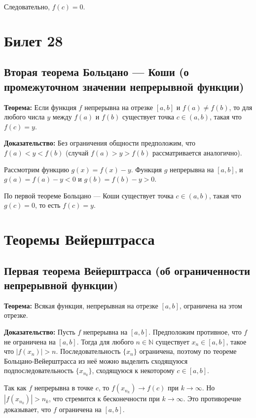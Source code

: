 \documentclass{article}
\begin{document}
Следовательно, \( f(c) = 0 \).

\section{Билет 28}

\subsection*{Вторая теорема Больцано — Коши (о промежуточном значении непрерывной функции)}

\textbf{Теорема:} Если функция \( f \) непрерывна на отрезке \([a, b]\) и \( f(a) \neq f(b) \), то для любого числа \( y \) между \( f(a) \) и \( f(b) \) существует точка \( c \in (a, b) \), такая что \( f(c) = y \).

\textbf{Доказательство:} Без ограничения общности предположим, что \( f(a) < y < f(b) \) (случай \( f(a) > y > f(b) \) рассматривается аналогично).

Рассмотрим функцию \( g(x) = f(x) - y \). Функция \( g \) непрерывна на \([a, b]\), и \( g(a) = f(a) - y < 0 \) и \( g(b) = f(b) - y > 0 \).

По первой теореме Больцано — Коши существует точка \( c \in (a, b) \), такая что \( g(c) = 0 \), то есть \( f(c) = y \).

\section*{Теоремы Вейерштрасса}

\subsection*{Первая теорема Вейерштрасса (об ограниченности непрерывной функции)}

\textbf{Теорема:} Всякая функция, непрерывная на отрезке \([a, b]\), ограничена на этом отрезке.

\textbf{Доказательство:} Пусть \( f \) непрерывна на \([a, b]\). Предположим противное, что \( f \) не ограничена на \([a, b]\). Тогда для любого \( n \in \mathbb{N} \) существует \( x_n \in [a, b] \), такое что \( |f(x_n)| > n \). Последовательность \( \{x_n\} \) ограничена, поэтому по теореме Больцано-Вейерштрасса из неё можно выделить сходящуюся подпоследовательность \( \{x_{n_k}\} \), сходящуюся к некоторому \( c \in [a, b] \).

Так как \( f \) непрерывна в точке \( c \), то \( f(x_{n_k}) \to f(c) \) при \( k \to \infty \). Но \( |f(x_{n_k})| > n_k \), что стремится к бесконечности при \( k \to \infty \). Это противоречие доказывает, что \( f \) ограничена на \([a, b]\).
\end{document}
